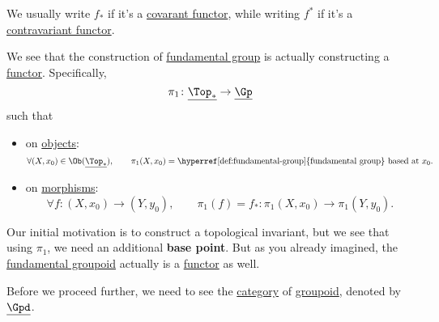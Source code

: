 \begin{remark}
	We usually write \(f_\ast\) if it's a \hyperref[def:functor]{covarant functor}, while writing \(f^\ast\)
	if it's a \hyperref[def:contravariant-functor]{contravariant functor}.
\end{remark}
\begin{remark}
	We see that the construction of \hyperref[def:fundamental-group]{fundamental group} is actually constructing a \hyperref[def:functor]{functor}. Specifically,
	\[
		\pi _1\colon \underline{\Top_*} \to \underline{\Gp}
	\]
	such that
	\begin{itemize}
		\item on \hyperref[def:object]{objects}:
		      \[
			      \forall (X, x_{0} )\in \Ob (\underline{\Top_*}),\qquad \pi _1(X, x_0) = \text{\hyperref[def:fundamental-group]{fundamental group} based at \(x_0\)}.
		      \]
		\item on \hyperref[def:morphism]{morphisms}:
		      \[
			      \forall f\colon (X, x_0)\to (Y, y_0),\qquad \pi _1(f) = f_\ast \colon \pi _1(X, x_0)\to \pi _1(Y, y_0).
		      \]
	\end{itemize}
\end{remark}

Our initial motivation is to construct a topological invariant, but we see that using \(\pi _1\), we need an additional \textbf{base point}. But as you already
imagined, the \hyperref[def:fundamental-groupoid]{fundamental groupoid} actually is a \hyperref[def:functor]{functor} as well.

Before we proceed further, we need to see the \hyperref[def:category]{category} of \hyperref[def:groupoid]{groupoid}, denoted by \(\underline{\Gpd}\).


